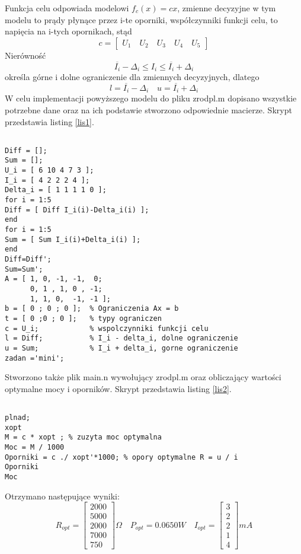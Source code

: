 \documentclass[a4paper,15pt]{article}
\begin{document}
Funkcja celu odpowiada modelowi \( f_{c}(x)=cx \), zmienne decyzyjne w tym modelu to prądy płynące przez i-te oporniki, współczynniki funkcji celu, to napięcia na i-tych opornikach, stąd 
\begin{equation*}
c = 
\begin{bmatrix}
U_{1} \quad U_{2} \quad  U_{3} \quad  U_{4}  \quad  U_{5}
\end{bmatrix}
\end{equation*}
Nierówność 
\begin{equation*}
\overline{I_{i}}-\Delta_{i} \leq I_{i} \leq \overline{I_{i}}+\Delta_{i}
\end{equation*}  
określa górne i dolne ograniczenie dla zmiennych decyzyjnych, dlatego
\begin{equation*}
l = 
\overline{I_{i}}-\Delta_{i} \quad
u = 
\overline{I_{i}}+\Delta_{i}
\end{equation*}
W celu implementacji powyższego modelu do pliku zrodpl.m dopisano wszystkie potrzebne dane oraz na ich podstawie stworzono odpowiednie macierze. Skrypt przedstawia listing \ref{lis1}.
\begin{lstlisting}[caption=zrodpl.m, captionpos=b,
label=lis1, firstnumber=12,frame=single]

Diff = [];
Sum = [];
U_i = [ 6 10 4 7 3 ];
I_i = [ 4 2 2 2 4 ];
Delta_i = [ 1 1 1 1 0 ];
for i = 1:5
Diff = [ Diff I_i(i)-Delta_i(i) ];
end
for i = 1:5
Sum = [ Sum I_i(i)+Delta_i(i) ];
end
Diff=Diff';
Sum=Sum';
A = [ 1, 0, -1, -1,  0;
      0, 1 , 1, 0 , -1;
      1, 1, 0,  -1, -1 ];
b = [ 0 ; 0 ; 0 ];  % Ograniczenia Ax = b
t = [ 0 ;0 ; 0 ];   % typy ograniczen
c = U_i;            % wspolczynniki funkcji celu
l = Diff;           % I_i - delta_i, dolne ograniczenie
u = Sum;            % I_i + delta_i, gorne ograniczenie
zadan ='mini';
\end{lstlisting}

Stworzono także plik main.n wywołujący zrodpl.m oraz obliczający wartości optymalne mocy i oporników. Skrypt przedstawia listing \ref{lis2}.
\begin{lstlisting}[caption=main.m, captionpos=b,
label=lis2, firstnumber=12,frame=single]

plnad;
xopt 
M = c * xopt ; % zuzyta moc optymalna
Moc = M / 1000
Oporniki = c ./ xopt'*1000; % opory optymalne R = u / i
Oporniki
Moc
\end{lstlisting}

Otrzymano następujące wyniki: 
\begin{equation*}
R_{opt} = 
\begin{bmatrix}
2000 \\ 
5000 \\
2000 \\ 
7000 \\
750
\end{bmatrix}
\Omega
\quad
P_{opt} = 0.0650 W
\quad
I_{opt} =
\begin{bmatrix}
3 \\
2 \\
2 \\
1 \\
4
\end{bmatrix}
mA
\end{equation*}
\end{document}
